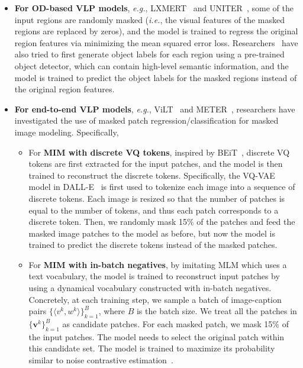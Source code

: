 \begin{itemize}[leftmargin=*]
    \item \textbf{For OD-based VLP models}, \emph{e.g.}, LXMERT~\citep{tan-bansal-2019-lxmert} and UNITER~\citep{chen2020uniter}, some of the input regions are randomly masked (\emph{i.e.}, the visual features of the masked regions are replaced by zeros), and the model is trained to regress the original region features via minimizing the mean squared error loss. Researchers~\citep{tan-bansal-2019-lxmert,lu2019vilbert,chen2020uniter} have also tried to first generate object labels for each region using a pre-trained object detector, which can contain high-level semantic information, and the model is trained to predict the object labels for the masked regions instead of the original region features. 
    \item \textbf{For end-to-end VLP models}, \emph{e.g.}, ViLT~\citep{kim2021vilt} and METER~\citep{dou2021empirical}, researchers have investigated the use of masked patch regression/classification for masked image modeling. Specifically, 
        \begin{itemize}[leftmargin=*]
            \item For \textbf{MIM with discrete VQ tokens}, inspired by BEiT~\citep{bao2021beit}, discrete VQ tokens are first extracted for the input patches, and the model is then trained to reconstruct the discrete tokens. Specifically, the VQ-VAE~\citep{van2017neural} model in DALL-E~\citep{ramesh2021dalle} is first used to tokenize each image into a sequence of discrete tokens. Each image is resized so that the number of patches is equal to the number of tokens, and thus each patch corresponds to a discrete token. Then, we randomly mask 15\% of the patches and feed the masked image patches to the model as before, but now the model is trained to predict the discrete tokens instead of the masked patches.
            \item For \textbf{MIM with in-batch negatives}, by imitating MLM which uses a text vocabulary, the model is trained to reconstruct input patches by using a dynamical vocabulary constructed with in-batch negatives. Concretely, at each training step, we sample a batch of image-caption pairs $\{ \langle v^k, w^k \rangle \}_{k=1}^B$, where $B$ is the batch size. We treat all the patches in $\{ \mathbf{v}^k \}_{k=1}^B$ as candidate patches. For each masked patch, we mask 15\% of the input patches. The model needs to select the original patch within this candidate set. The model is trained to maximize its probability similar to noise contrastive estimation~\citep{nce1}.
        \end{itemize}
\end{itemize}

